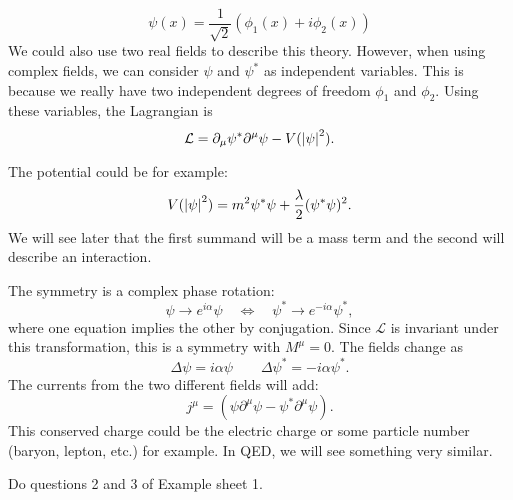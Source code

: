 \begin{example}
  \begin{equation}
    \psi (x) = \frac{1}{\sqrt{2}} (\phi_1(x) + i \phi_{2}(x))
  \end{equation}
  We could also use two real fields to describe this theory. However, when using complex fields, we can consider $\psi$ and $\psi^*$ as independent variables. This is because we really have two independent degrees of freedom $\phi_1$ and $\phi_2$.
  Using these variables, the Lagrangian is
  \begin{equation}
    \mathcal{L} = \partial_\mu \psi^* \partial^\mu \psi - V(\abs{\psi}^2).
  \end{equation}
  \begin{leftbar}
    \begin{remark}
      The potential could be for example:
      \begin{equation}
	V(\abs{\psi}^2) = m^2 \psi^* \psi + \frac{\lambda}{2} (\psi^* \psi)^2.
      \end{equation}
      We will see later that the first summand will be a mass term and the second will describe an interaction.
    \end{remark}
  \end{leftbar}
  The symmetry is a complex phase rotation:
  \begin{equation}
    \psi \to e^{i\alpha} \psi \quad \iff \quad \psi^* \to e^{-i\alpha} \psi^*,
  \end{equation}
  where one equation implies the other by conjugation.
  Since $\mathcal{L}$ is invariant under this transformation, this is a symmetry with $M^\mu = 0$.
  The fields change as
  \begin{equation}
    \Delta \psi = i \alpha \psi \qquad \Delta \psi^* = -i \alpha \psi^*.
  \end{equation}
  The currents from the two different fields will add:
  \begin{equation}
    j^\mu = (\psi \partial^\mu \psi - \psi^* \partial^\mu \psi).
  \end{equation}
  This conserved charge could be the electric charge or some particle number (baryon, lepton, etc.) for example. In QED, we will see something very similar.
\end{example} 

\begin{exercise}
Do questions 2 and 3 of Example sheet 1.
\end{exercise}
